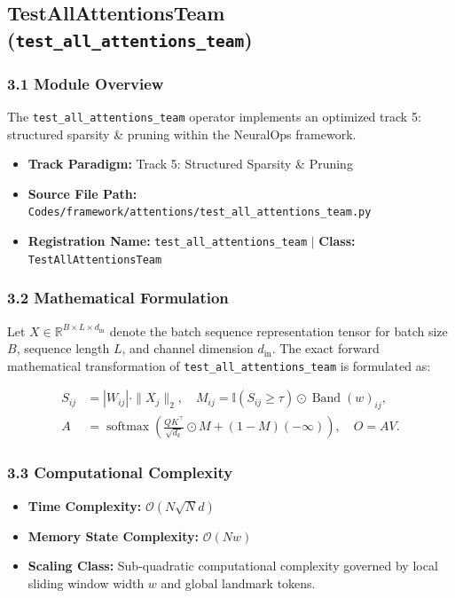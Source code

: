 \subsection{TestAllAttentionsTeam (\texttt{test\_all\_attentions\_team})}
\label{sec:app_module_test_all_attentions_team}

\subsubsection*{3.1 Module Overview}
The \texttt{test\_all\_attentions\_team} operator implements an optimized track 5: structured sparsity \& pruning within the NeuralOps framework.
\begin{itemize}
    \item \textbf{Track Paradigm:} Track 5: Structured Sparsity \& Pruning
    \item \textbf{Source File Path:} \texttt{Codes/framework/attentions/test\_all\_attentions\_team.py}
    \item \textbf{Registration Name:} \texttt{test\_all\_attentions\_team} $\mid$ \textbf{Class:} \texttt{TestAllAttentionsTeam}
\end{itemize}

\subsubsection*{3.2 Mathematical Formulation}
Let $X \in \mathbb{R}^{B \times L \times d_{\text{in}}}$ denote the batch sequence representation tensor for batch size $B$, sequence length $L$, and channel dimension $d_{\text{in}}$. The exact forward mathematical transformation of \texttt{test\_all\_attentions\_team} is formulated as:

\begin{align}
S_{ij} &= |W_{ij}| \cdot \|X_j\|_2, \quad M_{ij} = \mathbb{I}(S_{ij} \ge \tau) \odot \operatorname{Band}(w)_{ij}, \\
A &= \operatorname{softmax}\left(\frac{Q K^\top}{\sqrt{d_k}} \odot M + (1 - M)(-\infty)\right), \quad O = A V.
\end{align}


\subsubsection*{3.3 Computational Complexity}
\begin{itemize}
    \item \textbf{Time Complexity:} $\mathcal{O}(N \sqrt{N} d)$
    \item \textbf{Memory State Complexity:} $\mathcal{O}(N w)$
    \item \textbf{Scaling Class:} Sub-quadratic computational complexity governed by local sliding window width $w$ and global landmark tokens.
\end{itemize}

